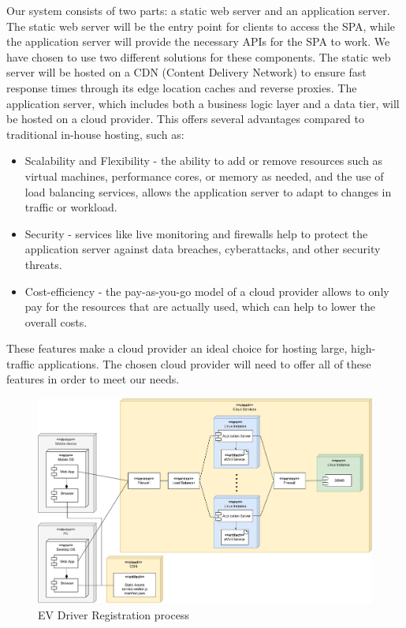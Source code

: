 Our system consists of two parts: a static web server and an application server. The static web server will be the entry point for clients to access the SPA, while the application server will provide the necessary APIs for the SPA to work. We have chosen to use two different solutions for these components. The static web server will be hosted on a CDN (Content Delivery Network) to ensure fast response times through its edge location caches and reverse proxies. The application server, which includes both a business logic layer and a data tier, will be hosted on a cloud provider.
This offers several advantages compared to traditional in-house hosting, such as:
\begin{itemize}
    \item Scalability and Flexibility - the ability to add or remove resources such as virtual machines, performance cores, or memory as needed, and the use of load balancing services, allows the application server to adapt to changes in traffic or workload.
    \item Security - services like live monitoring and firewalls help to protect the application server against data breaches, cyberattacks, and other security threats.
    \item Cost-efficiency - the pay-as-you-go model of a cloud provider allows to only pay for the resources that are actually used, which can help to lower the overall costs.
\end{itemize}
These features make a cloud provider an ideal choice for hosting large, high-traffic applications. The chosen cloud provider will need to offer all of these features in order to meet our needs.

\begin{figure}[H]
    \centering
    \includegraphics[scale=0.55]{src/deploymentDiagram/deployment_diagram.pdf}
    \caption{EV Driver Registration process}
\end{figure}

